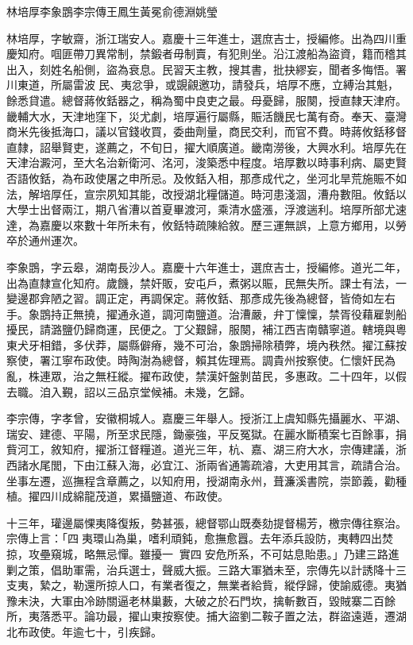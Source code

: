
\begin{pinyinscope}
林培厚李象鵾李宗傳王鳳生黃冕俞德淵姚瑩

林培厚，字敏齋，浙江瑞安人。嘉慶十三年進士，選庶吉士，授編修。出為四川重慶知府。啯匪帶刀異常制，禁鍛者毋制賣，有犯則坐。沿江渡船為盜資，籍而稽其出入，刻姓名船側，盜為衰息。民習天主教，搜其書，批抉繆妄，聞者多悔悟。署川東道，所屬雷波民、夷忿爭，或覬覦邀功，請發兵，培厚不應，立縛治其魁，餘悉貸遣。總督蔣攸銛器之，稱為蜀中良吏之最。母憂歸，服闋，授直隸天津府。畿輔大水，天津地窪下，災尤劇，培厚遍行屬縣，賑活饑民七萬有奇。奉天、臺灣商米先後抵海口，議以官錢收買，委曲劑量，商民交利，而官不費。時蔣攸銛移督直隸，詔舉賢吏，遂薦之，不旬日，擢大順廣道。畿南澇後，大興水利。培厚先在天津治澱河，至大名治新衛河、洺河，浚築悉中程度。培厚數以時事利病、屬吏賢否語攸銛，為布政使屠之申所忌。及攸銛入相，那彥成代之，坐河北旱荒施賑不如法，解培厚任，宣宗夙知其能，改授湖北糧儲道。時河患淺涸，漕舟數阻。攸銛以大學士出督兩江，期八省漕以首夏畢渡河，乘清水盛漲，浮渡遄利。培厚所部尤速達，為嘉慶以來數十年所未有，攸銛特疏陳給敘。歷三運無誤，上意方鄉用，以勞卒於通州運次。

李象鵾，字云皋，湖南長沙人。嘉慶十六年進士，選庶吉士，授編修。道光二年，出為直隸宣化知府。歲饑，禁奸販，安屯戶，煮粥以賑，民無失所。課士有法，一變邊郡弇陋之習。調正定，再調保定。蔣攸銛、那彥成先後為總督，皆倚如左右手。象鵾持正無撓，擢通永道，調河南鹽道。治漕嚴，弁丁懍懍，禁胥役藉雇剝船擾民，請潞鹽仍歸商運，民便之。丁父艱歸，服闋，補江西吉南贛寧道。轄境與粵東犬牙相錯，多伏莽，屬縣僻瘠，幾不可治，象鵾掃除積弊，境內秩然。擢江蘇按察使，署江寧布政使。時陶澍為總督，賴其佐理焉。調貴州按察使。仁懷奸民為亂，株連眾，治之無枉縱。擢布政使，禁漢奸盤剝苗民，多惠政。二十四年，以假去職。洎入覲，詔以三品京堂候補。未幾，乞歸。

李宗傳，字孝曾，安徽桐城人。嘉慶三年舉人。授浙江上虞知縣先攝麗水、平湖、瑞安、建德、平陽，所至求民隱，鋤豪強，平反冤獄。在麗水斷積案七百餘事，捐貲河工，敘知府，擢浙江督糧道。道光三年，杭、嘉、湖三府大水，宗傳建議，浙西諸水尾閭，下由江蘇入海，必宜江、浙兩省通籌疏濬，大吏用其言，疏請合治。坐事左遷，巡撫程含章薦之，以知府用，授湖南永州，葺濂溪書院，崇節義，勸種植。擢四川成綿龍茂道，累攝鹽道、布政使。

十三年，瓘邊屬惈夷降復叛，勢甚張，總督鄂山既奏劾提督楊芳，檄宗傳往察治。宗傳上言：「四夷環山為巢，嗜利頑鈍，愈撫愈囂。去年添兵設防，夷轉四出焚掠，攻壘窺城，略無忌憚。雖擾一，實四安危所系，不可姑息貽患。」乃建三路進剿之策，倡助軍需，治兵選士，聲威大振。三路大軍猶未至，宗傳先以計誘降十三支夷，縶之，勒還所掠人口，有業者復之，無業者給貲，縱俘歸，使諭威德。夷猶豫未決，大軍由冷跡關逼老林巢藪，大破之於石門坎，擒斬數百，毀賊寨二百餘所，夷落悉平。論功最，擢山東按察使。捕大盜劉二鞍子置之法，群盜遠遁，遷湖北布政使。年逾七十，引疾歸。


\end{pinyinscope}
